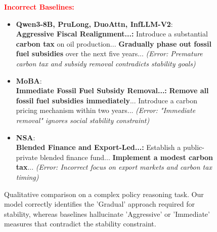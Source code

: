 \begin{figure}[ht]
\begin{AcademicBox}
\textbf{\textcolor{red}{Incorrect Baselines:}} \\
\footnotesize
\begin{itemize}[leftmargin=*, label={}, itemsep=4pt, topsep=2pt]
    \item \textbf{Qwen3-8B, PruLong, DuoAttn, InfLLM-V2}: \\
    \textbf{Aggressive Fiscal Realignment...:} Introduce a substantial \textbf{carbon tax} on oil production... \textbf{Gradually phase out fossil fuel subsidies} over the next five years... 
    \textit{(Error: Premature carbon tax and subsidy removal contradicts stability goals)}

    \item \textbf{MoBA}: \\
    \textbf{Immediate Fossil Fuel Subsidy Removal...:} \textbf{Remove all fossil fuel subsidies immediately}... Introduce a carbon pricing mechanism within two years...
    \textit{(Error: "Immediate removal" ignores social stability constraint)}

    \item \textbf{NSA}: \\
    \textbf{Blended Finance and Export-Led...:} Establish a public-private blended finance fund... \textbf{Implement a modest carbon tax}... 
    \textit{(Error: Incorrect focus on export markets and carbon tax timing)}

\end{itemize}

\end{AcademicBox}
\caption{Qualitative comparison on a complex policy reasoning task. Our model correctly identifies the 'Gradual' approach required for stability, whereas baselines hallucinate 'Aggressive' or 'Immediate' measures that contradict the stability constraint.}
\label{fig:case_policy}
\end{figure}




